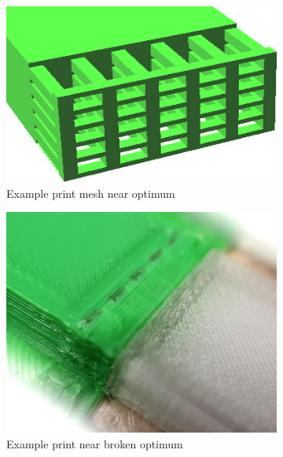 \begin{figure}
	\centering
	\begin{subfigure}[B]{.24\columnwidth}
		\centering
		\includegraphics[width=\columnwidth]{sources/testing/straight_sample.jpg}
		\caption{Example print mesh near optimum}
		\label{fig:test_straight_boundary_cells}
	\end{subfigure}
	\begin{subfigure}[B]{.24\columnwidth}
		\centering
		\includegraphics[width=\columnwidth]{sources/testing/straight_print.jpg}
		\caption{Example print near broken optimum}
	\end{subfigure}
	\begin{subfigure}[B]{.5\columnwidth}
		\centering

\end{subfigure}
\end{figure}
